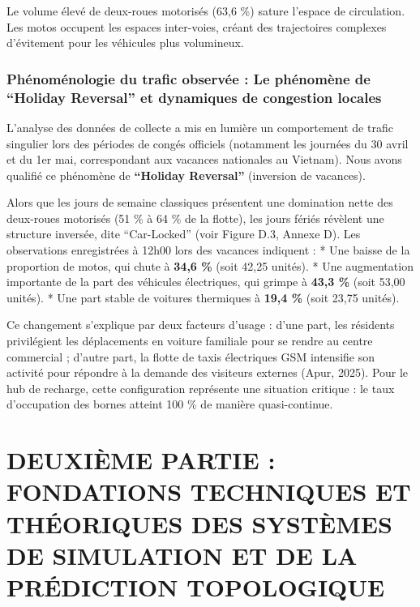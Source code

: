 \documentclass[11pt, a4paper]{article}
\begin{document}
Le volume élevé de deux-roues motorisés (63,6 \%) sature l'espace de
circulation. Les motos occupent les espaces inter-voies, créant des
trajectoires complexes d'évitement pour les véhicules plus volumineux.

\subsubsection{Phénoménologie du trafic observée : Le phénomène de
``Holiday Reversal'' et dynamiques de congestion
locales}\label{phuxe9nomuxe9nologie-du-trafic-observuxe9e-le-phuxe9nomuxe8ne-de-holiday-reversal-et-dynamiques-de-congestion-locales}

L'analyse des données de collecte a mis en lumière un comportement de
trafic singulier lors des périodes de congés officiels (notamment les
journées du 30 avril et du 1er mai, correspondant aux vacances
nationales au Vietnam). Nous avons qualifié ce phénomène de
\textbf{``Holiday Reversal''} (inversion de vacances).

Alors que les jours de semaine classiques présentent une domination
nette des deux-roues motorisés (51 \% à 64 \% de la flotte), les jours
fériés révèlent une structure inversée, dite ``Car-Locked'' (voir Figure
D.3, Annexe D). Les observations enregistrées à 12h00 lors des vacances
indiquent : * Une baisse de la proportion de motos, qui chute à
\textbf{34,6 \%} (soit 42,25 unités). * Une augmentation importante de
la part des véhicules électriques, qui grimpe à \textbf{43,3 \%} (soit
53,00 unités). * Une part stable de voitures thermiques à \textbf{19,4
\%} (soit 23,75 unités).

Ce changement s'explique par deux facteurs d'usage : d'une part, les
résidents privilégient les déplacements en voiture familiale pour se
rendre au centre commercial ; d'autre part, la flotte de taxis
électriques GSM intensifie son activité pour répondre à la demande des
visiteurs externes (Apur, 2025). Pour le hub de recharge, cette
configuration représente une situation critique : le taux d'occupation
des bornes atteint 100 \% de manière quasi-continue.

\newpage

\section{DEUXIÈME PARTIE : FONDATIONS TECHNIQUES ET THÉORIQUES DES
SYSTÈMES DE SIMULATION ET DE LA PRÉDICTION
TOPOLOGIQUE}\label{deuxiuxe8me-partie-fondations-techniques-et-thuxe9oriques-des-systuxe8mes-de-simulation-et-de-la-pruxe9diction-topologique}
\end{document}
